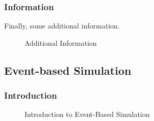 \documentclass{article}
\begin{document}
\begin{normalsize}
\subsubsection{Information}
Finally, some additional information.
\begin{figure}[H]
	\caption{Additional Information}
\end{figure}

\subsection{Event-based Simulation}

\subsubsection{Introduction}

\begin{figure}[H]
	\caption{Introduction to Event-Based Simulation}
\end{figure}


\end{normalsize}
\end{document}
